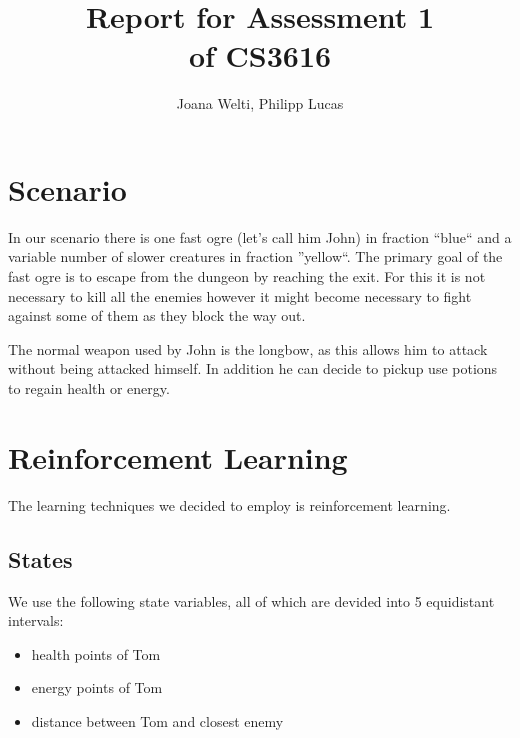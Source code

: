 \documentclass[a4paper,10pt]{scrartcl}
\title{Report for Assessment 1 \\ \large{of CS3616}}
\author{Joana Welti, Philipp Lucas}
\begin{document}

\maketitle
\newpage

\tableofcontents

\newpage

\section{Scenario}
In our scenario there is one fast ogre (let's call him John) in fraction ``blue`` and a variable number of slower creatures in fraction ''yellow``. The primary goal of the fast ogre is to escape from the dungeon by reaching the exit. For this it is not necessary to kill all the enemies however it might become necessary to fight against some of them as they block the way out.\par
The normal weapon used by John is the longbow, as this allows him to attack without being attacked himself. In addition he can decide to pickup use potions to regain health or energy.

\section{Reinforcement Learning}
The learning techniques we decided to employ is reinforcement learning. 

\subsection{States}
We use the following state variables, all of which are devided into 5 equidistant intervals:
\begin{itemize}
 \item health points of Tom
 \item energy points of Tom
 \item distance between Tom and closest enemy
\end{itemize}
\end{document}
